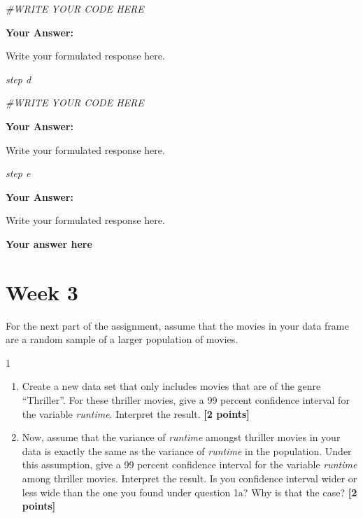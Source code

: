 \documentclass[
]{article}
\newenvironment{Shaded}{\begin{snugshade}}{\end{snugshade}}
\newcommand{\CommentTok}[1]{\textcolor[rgb]{0.56,0.35,0.01}{\textit{#1}}}
\providecommand{\tightlist}{%
  \setlength{\itemsep}{0pt}\setlength{\parskip}{0pt}}
\begin{document}
\begin{Shaded}
\begin{Highlighting}[]
\CommentTok{\#WRITE YOUR CODE HERE}
\end{Highlighting}
\end{Shaded}

\textbf{Your Answer:}

Write your formulated response here.

\emph{step d}

\begin{Shaded}
\begin{Highlighting}[]
\CommentTok{\#WRITE YOUR CODE HERE}
\end{Highlighting}
\end{Shaded}

\textbf{Your Answer:}

Write your formulated response here.

\emph{step e}

\textbf{Your Answer:}

Write your formulated response here.

\textbf{Your answer here}

\section{Week 3}\label{week-3}

For the next part of the assignment, assume that the movies in your data
frame are a random sample of a larger population of movies.

1

\begin{enumerate}
\def\labelenumi{\alph{enumi}.}
\tightlist
\item
  Create a new data set that only includes movies that are of the genre
  ``Thriller''. For these thriller movies, give a 99 percent confidence
  interval for the variable \emph{runtime}. Interpret the result.
  \textbf{[2 points]}
\item
  Now, assume that the variance of \emph{runtime} amongst thriller
  movies in your data is exactly the same as the variance of
  \emph{runtime} in the population. Under this assumption, give a 99
  percent confidence interval for the variable \emph{runtime} among
  thriller movies. Interpret the result. Is you confidence interval
  wider or less wide than the one you found under question 1a? Why is
  that the case? \textbf{[2 points]}
\end{enumerate}
\end{document}
